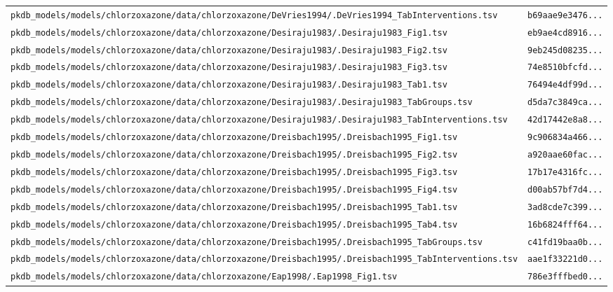 \documentclass{article}
\begin{document}
\begin{longtable}{ll}
\texttt{pkdb\_models/models/chlorzoxazone/data/chlorzoxazone/DeVries1994/.DeVries1994\_TabInterventions.tsv} & \texttt{b69aae9e3476...} \\
\texttt{pkdb\_models/models/chlorzoxazone/data/chlorzoxazone/Desiraju1983/.Desiraju1983\_Fig1.tsv} & \texttt{eb9ae4cd8916...} \\
\texttt{pkdb\_models/models/chlorzoxazone/data/chlorzoxazone/Desiraju1983/.Desiraju1983\_Fig2.tsv} & \texttt{9eb245d08235...} \\
\texttt{pkdb\_models/models/chlorzoxazone/data/chlorzoxazone/Desiraju1983/.Desiraju1983\_Fig3.tsv} & \texttt{74e8510bfcfd...} \\
\texttt{pkdb\_models/models/chlorzoxazone/data/chlorzoxazone/Desiraju1983/.Desiraju1983\_Tab1.tsv} & \texttt{76494e4df99d...} \\
\texttt{pkdb\_models/models/chlorzoxazone/data/chlorzoxazone/Desiraju1983/.Desiraju1983\_TabGroups.tsv} & \texttt{d5da7c3849ca...} \\
\texttt{pkdb\_models/models/chlorzoxazone/data/chlorzoxazone/Desiraju1983/.Desiraju1983\_TabInterventions.tsv} & \texttt{42d17442e8a8...} \\
\texttt{pkdb\_models/models/chlorzoxazone/data/chlorzoxazone/Dreisbach1995/.Dreisbach1995\_Fig1.tsv} & \texttt{9c906834a466...} \\
\texttt{pkdb\_models/models/chlorzoxazone/data/chlorzoxazone/Dreisbach1995/.Dreisbach1995\_Fig2.tsv} & \texttt{a920aae60fac...} \\
\texttt{pkdb\_models/models/chlorzoxazone/data/chlorzoxazone/Dreisbach1995/.Dreisbach1995\_Fig3.tsv} & \texttt{17b17e4316fc...} \\
\texttt{pkdb\_models/models/chlorzoxazone/data/chlorzoxazone/Dreisbach1995/.Dreisbach1995\_Fig4.tsv} & \texttt{d00ab57bf7d4...} \\
\texttt{pkdb\_models/models/chlorzoxazone/data/chlorzoxazone/Dreisbach1995/.Dreisbach1995\_Tab1.tsv} & \texttt{3ad8cde7c399...} \\
\texttt{pkdb\_models/models/chlorzoxazone/data/chlorzoxazone/Dreisbach1995/.Dreisbach1995\_Tab4.tsv} & \texttt{16b6824fff64...} \\
\texttt{pkdb\_models/models/chlorzoxazone/data/chlorzoxazone/Dreisbach1995/.Dreisbach1995\_TabGroups.tsv} & \texttt{c41fd19baa0b...} \\
\texttt{pkdb\_models/models/chlorzoxazone/data/chlorzoxazone/Dreisbach1995/.Dreisbach1995\_TabInterventions.tsv} & \texttt{aae1f33221d0...} \\
\texttt{pkdb\_models/models/chlorzoxazone/data/chlorzoxazone/Eap1998/.Eap1998\_Fig1.tsv} & \texttt{786e3fffbed0...} \\

\end{longtable}
\end{document}
